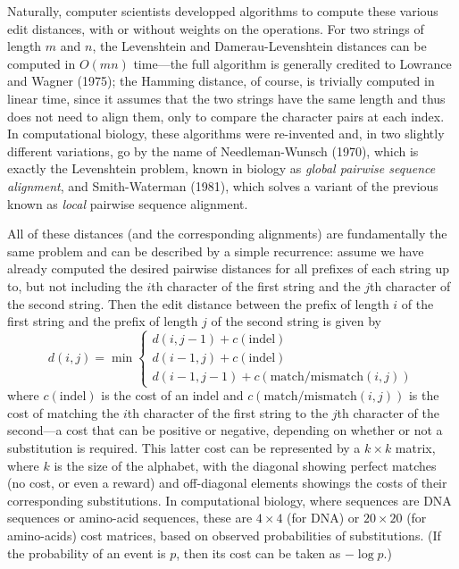 \documentclass[11pt]{article}
\begin{document}
Naturally, computer scientists developped algorithms to compute these
various edit distances, with or without weights on the operations.
For two strings of length $m$ and $n$, the Levenshtein and Damerau-Levenshtein
distances can be computed in $O(mn)$ time---the full algorithm is
generally credited to Lowrance and Wagner (1975); the Hamming distance,
of course, is trivially computed in linear time, since it assumes that
the two strings have the same length and thus does not need to align them,
only to compare the character pairs at each index.
In computational biology, these algorithms were re-invented and, in
two slightly different variations, go by the name of Needleman-Wunsch (1970),
which is exactly the Levenshtein problem, known in biology as
\emph{global pairwise sequence alignment}, and Smith-Waterman (1981),
which solves a variant of the previous known as \emph{local} pairwise sequence
alignment.

All of these distances (and the corresponding alignments) are fundamentally
the same problem and can be described by a simple recurrence:
assume we have already computed the desired pairwise distances for all prefixes
of each string up to, but not including the $i$th character of the first
string and the $j$th character of the second string.  Then the edit distance
between the prefix of length $i$ of the first string and the prefix of length
$j$ of the second string is given by
\begin{displaymath}
  d(i,j) = \min \begin{cases}
		  d(i,j-1) + c(\text{indel})\\
		  d(i-1,j) + c(\text{indel})\\
		  d(i-1,j-1) + c(\text{match/mismatch}(i,j))
                \end{cases}
\end{displaymath}
where $c(\text{indel})$ is the cost of an indel and
$c(\text{match/mismatch}(i,j))$ is the cost of matching the $i$th character
of the first string to the $j$th character of the second---a cost that can
be positive or negative, depending on whether or not a substitution is
required.  This latter cost can be represented by a $k\times k$ matrix,
where $k$ is the size of the alphabet, with the diagonal showing perfect
matches (no cost, or even a reward) and off-diagonal elements showings
the costs of their corresponding substitutions.  In computational biology,
where sequences are DNA sequences or amino-acid sequences, these are
$4\times 4$ (for DNA) or $20\times 20$ (for amino-acids) cost matrices,
based on observed probabilities of substitutions.  (If the probability
of an event is $p$, then its cost can be taken as $-\log p$.)
\end{document}
